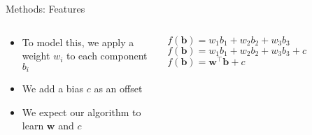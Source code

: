 \begin{slide}{Methods: Features}
  \begin{columns}
  \begin{column}{0.55\textwidth}
  \begin{itemize}
    \item<1-> To model this, we apply a weight $w_i$ to each component $b_i$
    \item<2-> We add a bias $c$ as an offset %
    \item<3-> We expect our algorithm to learn $\mathbf{w}$ and $c$%
  \end{itemize}
  \end{column}
  \begin{column}{0.45\textwidth}
    \centering
     {$f(\mathbf{b}) = w_1b_1 + w_2b_2 + w_3b_3$}
     {$f(\mathbf{b}) = w_1b_1 + w_2b_2 + w_3b_3 + c$}
     {$f(\mathbf{b}) = \mathbf{w}^\top\mathbf{b} + c$}
  \end{column}
\end{columns}
\end{slide}

